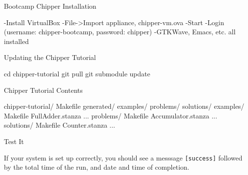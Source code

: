 \documentclass[xcolor=pdflatex,dvipsnames,table]{beamer}
\begin{document}
\begin{frame}[fragile]{Bootcamp Chipper Installation}
\begin{stanza}
-Install VirtualBox
-File->Import appliance, chipper-vm.ova
-Start
-Login (username: chipper-bootcamp, password: chipper)
-GTKWave, Emacs, etc. all installed
\end{stanza}
\end{frame}

\begin{frame}[fragile]{Updating the Chipper Tutorial}

\begin{stanza}
cd chipper-tutorial
git pull
git submodule update
\end{stanza}
\end{frame}

\begin{frame}[fragile]{Chipper Tutorial Contents}
\begin{FramedSemiVerb}
chipper-tutorial/  
  Makefile
  generated/
    examples/
    problems/
    solutions/
  examples/   
    Makefile  
    FullAdder.stanza ...
  problems/   
    Makefile
    Accumulator.stanza ...
  solutions/  
    Makefile
    Counter.stanza ...
\end{FramedSemiVerb}
\end{frame}

\begin{frame}[fragile]{Test It}



\vspace{1cm}
\noindent
If your system is set up correctly, you should see a messsage \verb+[success]+ followed by the total time of the run, and date and time of completion. 

\end{frame}
\end{document}

